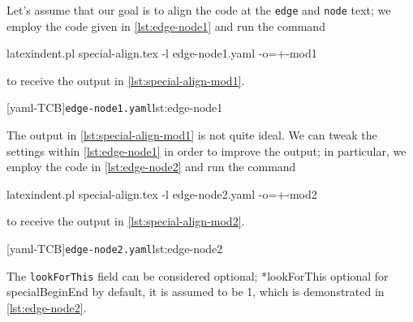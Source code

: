 	Let's assume that our goal is to align the code at the \texttt{edge} and \texttt{node}
	text; we employ the code given in \cref{lst:edge-node1} and run the command
	\begin{commandshell}
latexindent.pl special-align.tex -l edge-node1.yaml -o=+-mod1
\end{commandshell}
	to receive the output in \cref{lst:special-align-mod1}.

	\begin{cmhtcbraster}[ raster left skip=-3.5cm,]
		[yaml-TCB]{\texttt{edge-node1.yaml}}{lst:edge-node1}
	\end{cmhtcbraster}

	The output in \cref{lst:special-align-mod1} is not quite ideal. We can tweak the settings
	within \cref{lst:edge-node1} in order to improve the output; in particular, we employ the
	code in \cref{lst:edge-node2} and run the command
	\begin{commandshell}
latexindent.pl special-align.tex -l edge-node2.yaml -o=+-mod2
\end{commandshell}
	to receive the output in \cref{lst:special-align-mod2}.

	\begin{cmhtcbraster}[ raster left skip=-3.5cm,]
		[yaml-TCB]{\texttt{edge-node2.yaml}}{lst:edge-node2}
	\end{cmhtcbraster}

	The \texttt{lookForThis} field can be considered
	optional;%
	*{lookForThis optional for specialBeginEnd} by default, it is assumed to be 1, which is demonstrated in
	\cref{lst:edge-node2}.

